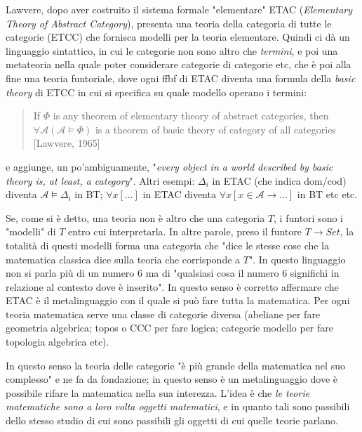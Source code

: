 \documentclass[a4paper, 11pt]{article}
\begin{document}
Lawvere, dopo aver costruito il sistema formale "elementare" ETAC (\emph{Elementary Theory of Abstract Category}), presenta una teoria della categoria di tutte le categorie (ETCC) che fornisca modelli per la teoria elementare. Quindi ci dà un linguaggio sintattico, in cui le categorie non sono altro che \emph{termini}, e poi una metateoria nella quale poter considerare categorie di categorie etc, che è poi alla fine una teoria funtoriale, dove ogni ffbf di ETAC diventa una formula della \emph{basic theory} di ETCC in cui si specifica su quale modello operano i termini:
\begin{quotation}
	If $\Phi$ is any theorem of elementary theory of abstract categories, then $ \forall \mathcal{A} (\mathcal{A} \models \Phi)$ is a theorem of basic theory of category of all categories [Lawvere, 1965]
\end{quotation}
e aggiunge, un po'ambiguamente, "\textit{every object in a world described by basic theory is, at least, a category}". Altri esempi: $\Delta_i$ in ETAC (che indica dom/cod) diventa $\mathcal{A} \models \Delta_i$ in BT; $\forall x [\dots]$ in ETAC diventa $\forall x [x \in \mathcal{A} \rightarrow \dots]$ in BT etc etc.


	Se, come si è detto, una teoria non è altro che una categoria $T$, i funtori sono i "modelli" di $T$ entro cui interpretarla. In altre parole, preso il funtore $T \to Set$, la totalità di questi modelli forma una categoria che "dice le stesse cose che la matematica classica dice sulla teoria che corrisponde a $T$". In questo linguaggio non si parla più di un numero 6 ma di "qualsiasi cosa il numero 6 significhi in relazione al contesto dove è inserito". 
	In questo senso è corretto affermare che ETAC è il metalinguaggio con il quale si può fare tutta la matematica. Per ogni teoria matematica serve una classe di categorie diversa (abeliane per fare geometria algebrica; topos o CCC per fare logica; categorie modello per fare topologia algebrica etc). \endfo

	In questo senso la teoria delle categorie "è più grande della matematica nel suo complesso" e ne fa da fondazione; in questo senso è un metalinguaggio dove è possibile rifare la matematica nella sua interezza. L'idea è che \emph{le teorie matematiche sono a loro volta oggetti matematici}, e in quanto tali sono passibili dello stesso studio di cui sono passibili gli oggetti di cui quelle teorie parlano.
	
\end{document}
